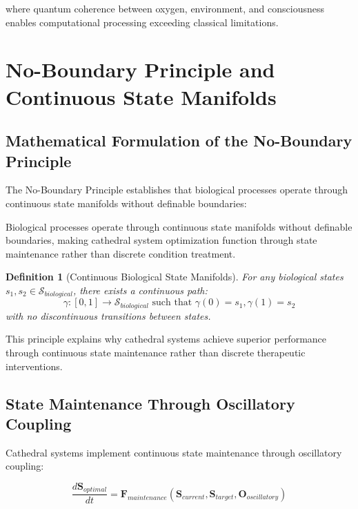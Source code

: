 \documentclass[12pt,a4paper]{article}
\newtheorem{definition}{Definition}
\begin{document}
where quantum coherence between oxygen, environment, and consciousness enables computational processing exceeding classical limitations.

\section{No-Boundary Principle and Continuous State Manifolds}

\subsection{Mathematical Formulation of the No-Boundary Principle}

The No-Boundary Principle establishes that biological processes operate through continuous state manifolds without definable boundaries:

\begin{principle}
Biological processes operate through continuous state manifolds without definable boundaries, making cathedral system optimization function through state maintenance rather than discrete condition treatment.
\end{principle}

\begin{definition}[Continuous Biological State Manifolds]
For any biological states $s_1, s_2 \in \mathcal{S}_{biological}$, there exists a continuous path:
\begin{equation}
\gamma: [0,1] \to \mathcal{S}_{biological} \text{ such that } \gamma(0) = s_1, \gamma(1) = s_2
\end{equation}
with no discontinuous transitions between states.
\end{definition}

This principle explains why cathedral systems achieve superior performance through continuous state maintenance rather than discrete therapeutic interventions.

\subsection{State Maintenance Through Oscillatory Coupling}

Cathedral systems implement continuous state maintenance through oscillatory coupling:

\begin{equation}
\frac{d\mathbf{S}_{optimal}}{dt} = \mathbf{F}_{maintenance}(\mathbf{S}_{current}, \mathbf{S}_{target}, \mathbf{O}_{oscillatory})
\end{equation}
\end{document}
